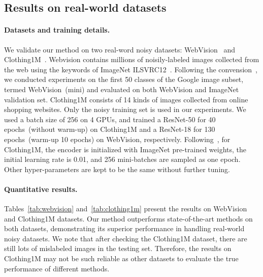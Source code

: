 \subsection{Results on real-world datasets}

\paragraph{Datasets and training details.} 
We validate our method on two real-word noisy datasets: WebVision~\cite{li2017webvision} and Clothing1M~\cite{xiao2015learning}. Webvision contains millions of noisily-labeled images collected from the web using the keywords of ImageNet ILSVRC12~\cite{deng2009imagenet}. Following the convension~\cite{ortego2021multi,li2020dividemix,li2021learning,liu2020early}, we conducted experiments on the first 50 classes of the Google image subset, termed WebVision~(mini) and evaluated on both WebVision and ImageNet validation set. Clothing1M consists of 14 kinds of images
collected from online shopping websites. Only the noisy training set is used in our experiments.
We used a batch size of 256 on 4 GPUs, and trained a ResNet-50 for 40 epochs~(without warm-up) on Clothing1M and a ResNet-18 for 130 epochs~(warm-up 10 epochs) on WebVision, respectively. Following~\cite{li2020dividemix,li2021learning,liu2020early}, for Clothing1M, the encoder is initialized with ImageNet pre-trained weights, the initial learning rate is 0.01, and 256 mini-batches are sampled as one epoch. Other hyper-parameters are kept to be the same without further tuning.

\paragraph{Quantitative results.} 
Tables~\ref{tab:webvision} and~\ref{tab:clothing1m} present the results on WebVision and Clothing1M datasets. Our method outperforms state-of-the-art methods on both datasets, demonstrating its superior performance in handling real-world noisy datasets. We note that after checking the Clothing1M dataset, there are still lots of mislabeled images in the testing set. Therefore, the results on Clothing1M may not be such reliable as other datasets to evaluate the true performance of different methods.

